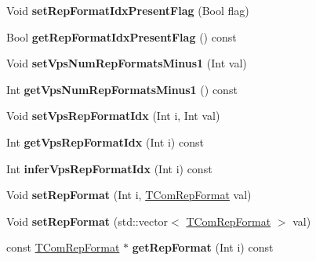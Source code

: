 \begin{DoxyCompactItemize}
\item 
\mbox{\label{class_t_com_v_p_s_ad88d4b74e9ab67ee3ae78e63fd209fd0}} 
Void {\bfseries set\+Rep\+Format\+Idx\+Present\+Flag} (Bool flag)
\item 
\mbox{\label{class_t_com_v_p_s_a2fe84453a2c759a99516ddb50f95b0b1}} 
Bool {\bfseries get\+Rep\+Format\+Idx\+Present\+Flag} () const
\item 
\mbox{\label{class_t_com_v_p_s_a14d0cf977ab0f429285350a372ba0254}} 
Void {\bfseries set\+Vps\+Num\+Rep\+Formats\+Minus1} (Int val)
\item 
\mbox{\label{class_t_com_v_p_s_a485550041a9ffa88f1f59f9fbd5365de}} 
Int {\bfseries get\+Vps\+Num\+Rep\+Formats\+Minus1} () const
\item 
\mbox{\label{class_t_com_v_p_s_ac905cc487e80a539247bf9c7df7beb26}} 
Void {\bfseries set\+Vps\+Rep\+Format\+Idx} (Int i, Int val)
\item 
\mbox{\label{class_t_com_v_p_s_a8fe83e06bc52f583ec411673a7f76b40}} 
Int {\bfseries get\+Vps\+Rep\+Format\+Idx} (Int i) const
\item 
\mbox{\label{class_t_com_v_p_s_a6d28e9868f91bd5653bc3e267b0e6977}} 
Int {\bfseries infer\+Vps\+Rep\+Format\+Idx} (Int i) const
\item 
\mbox{\label{class_t_com_v_p_s_a00b19545a54f98f819bf6afcd6ef429c}} 
Void {\bfseries set\+Rep\+Format} (Int i, \hyperlink{class_t_com_rep_format}{T\+Com\+Rep\+Format} val)
\item 
\mbox{\label{class_t_com_v_p_s_afeaa32bce3656f3d15ebe37771850f7a}} 
Void {\bfseries set\+Rep\+Format} (std\+::vector$<$ \hyperlink{class_t_com_rep_format}{T\+Com\+Rep\+Format} $>$ val)
\item 
\mbox{\label{class_t_com_v_p_s_af53e18cff5a1d5d01006e118137bfa00}} 
const \hyperlink{class_t_com_rep_format}{T\+Com\+Rep\+Format} $\ast$ {\bfseries get\+Rep\+Format} (Int i) const
\item 

\end{DoxyCompactItemize}
